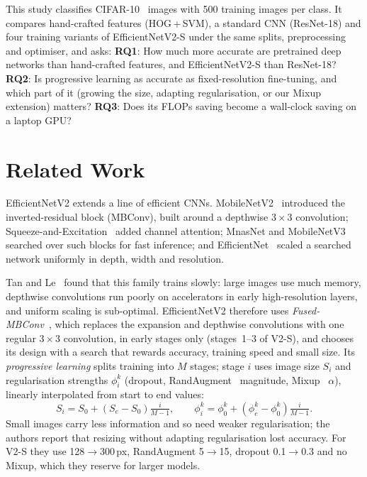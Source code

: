 \documentclass[10pt,twocolumn]{article}
\begin{document}
This study classifies CIFAR-10~\cite{krizhevsky2009learning} images with 500 training images per class.
It compares hand-crafted features (HOG\,+\,SVM), a standard CNN (ResNet-18) and four training variants
of EfficientNetV2-S under the same splits, preprocessing and optimiser, and asks:
\textbf{RQ1}: How much more accurate are pretrained deep networks than hand-crafted features, and
EfficientNetV2-S than ResNet-18?
\textbf{RQ2}: Is progressive learning as accurate as fixed-resolution fine-tuning, and which part of
it (growing the size, adapting regularisation, or our Mixup extension) matters?
\textbf{RQ3}: Does its FLOPs saving become a wall-clock saving on a laptop GPU?

\section{Related Work}
EfficientNetV2 extends a line of efficient CNNs. MobileNetV2~\cite{sandler2018mobilenetv2} introduced
the inverted-residual block (MBConv), built around a depthwise $3{\times}3$ convolution;
Squeeze-and-Excitation~\cite{hu2018squeeze} added channel attention; MnasNet and
MobileNetV3~\cite{tan2019mnasnet,howard2019searching} searched over such blocks for fast inference; and
EfficientNet~\cite{tan2019efficientnet} scaled a searched network uniformly in depth, width and
resolution.

Tan and Le~\cite{tan2021efficientnetv2} found that this family trains slowly: large images use much
memory, depthwise convolutions run poorly on accelerators in early high-resolution layers, and uniform
scaling is sub-optimal. EfficientNetV2 therefore uses \emph{Fused-MBConv}~\cite{gupta2020accelerator},
which replaces the expansion and depthwise convolutions with one regular $3{\times}3$ convolution, in
early stages only (stages~1--3 of V2-S), and chooses its design with a search that rewards accuracy,
training speed and small size. Its \emph{progressive learning} splits training into $M$ stages; stage
$i$ uses image size $S_i$ and regularisation strengths $\phi_i^{k}$ (dropout,
RandAugment~\cite{cubuk2020randaugment} magnitude, Mixup~\cite{zhang2018mixup} $\alpha$), linearly
interpolated from start to end values:
\begin{equation}
S_i = S_0 + (S_e - S_0)\tfrac{i}{M-1},\qquad
\phi_i^{k} = \phi_0^{k} + (\phi_e^{k}-\phi_0^{k})\tfrac{i}{M-1}.
\label{eq:prog}
\end{equation}
Small images carry less information and so need weaker regularisation; the authors report that
resizing without adapting regularisation lost accuracy. For V2-S they use 128$\to$300\,px, RandAugment
5$\to$15, dropout 0.1$\to$0.3 and no Mixup, which they reserve for larger models.
\end{document}
